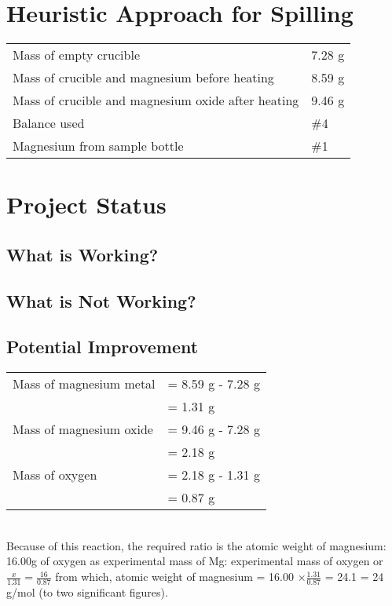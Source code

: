 \documentclass{article}
\begin{document}
\section{Heuristic Approach for Spilling}

\begin{tabular}{ll}
Mass of empty crucible & 7.28 g\\
Mass of crucible and magnesium before heating & 8.59 g\\
Mass of crucible and magnesium oxide after heating & 9.46 g\\
Balance used & \#4\\
Magnesium from sample bottle & \#1
\end{tabular}


\section{Project Status}
\subsection{What is Working?}
\subsection{What is Not Working?}
\subsection{Potential Improvement}
\begin{tabular}{ll}
Mass of magnesium metal & = 8.59 g - 7.28 g\\
& = 1.31 g\\
Mass of magnesium oxide & = 9.46 g - 7.28 g\\
& = 2.18 g\\
Mass of oxygen & = 2.18 g - 1.31 g\\
& = 0.87 g
\end{tabular}\\
Because of this reaction, the required ratio is the atomic weight of magnesium: 16.00g of oxygen as experimental mass of Mg: experimental mass of oxygen or $\frac{x}{1.31}=\frac{16}{0.87}$ from which, atomic weight of magnesium = 16.00 $\times \frac{1.31}{0.87}$ = 24.1 = 24 g/mol (to two significant figures).
\end{document}
